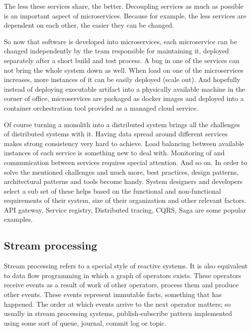 \documentclass[a4]{report}
\begin{document}
    The less these services share, the better.
    Decoupling services as much as possible is an important aspect of microservices.
    Because for example, the less services are dependent on each other, the easier they can be changed.

    So now that software is developed into microservices, each microservice can be changed independently by the
    team responsible for maintaining it, deployed separately after a short build and test process.
    A bug in one of the services can not bring the whole system down as well.
    When load on one of the microservices increases, more instances of it can be easily deployed (scale out).
    And hopefully instead of deploying executable artifact into a physically available machine in the corner of
    office, microservices are packaged as docker images and deployed into a container orchestration tool provided as
    a managed cloud service.

    Of course turning a monolith into a distributed system brings all the challenges of distributed systems with it.
    Having data spread around different services makes strong consistency very hard to achieve.
    Load balancing between available instances of each service is something new to deal with.
    Monitoring of and communication between services requires special attention.
    And so on.
    In order to solve the mentioned challenges and much more, best practices, design patterns, architectural patterns
    and tools become handy.
    System designers and developers select a sub set of these helps based on the functional and non-functional
    requirements of their system, size of their organization and other relevant factors.
    API gateway, Service registry, Distributed tracing, CQRS, Saga are some popular examples.
    \cite{microservice-architecture} \cite{microservices-pitfalls} \cite{microservices}

    \subsection{Stream processing}
    Stream processing refers to a special style of reactive systems.
    It is also equivalent to data flow programming in which a graph of operators exists.
    These operators receive events as a result of work of other operators, process them and produce other events.
    These events represent immutable facts, something that has happened.
    The order at which events arrive to the next operator matters;
    so usually in stream processing systems, publish-subscribe pattern implemented using some sort of queue,
    journal, commit log or topic.
    \cite{flink} \cite{fast-data-archs}
\end{document}
